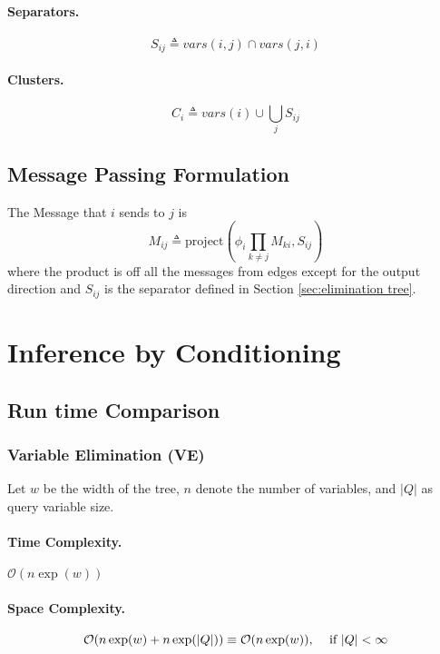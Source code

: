 \documentclass[11pt]{article}
\begin{document}
\paragraph{Separators.} 
\begin{equation}
	S_{ij} \triangleq vars(i, j) \cap vars(j, i)
\end{equation}

\paragraph{Clusters.} 
\begin{equation}
	C_i \triangleq vars(i) \cup \bigcup_j S_{ij}
\end{equation}

\subsection{Message Passing Formulation}
The Message that $i$ sends to $j$ is 
\begin{equation}
	M_{ij} \triangleq \mathrm{project} \left( \phi_i \prod_{k \neq j } M_{ki}, S_{ij} \right) 
\end{equation}
where the product is off all the messages from edges except for the output direction and $S_{ij}$ is the separator defined in Section \ref{sec:elimination tree}.


\section{Inference by Conditioning}
\subsection{Run time Comparison}
\subsubsection{Variable Elimination (VE)}
Let $w$ be the width of the tree, $n$ denote the number of variables, and $|Q|$ as query variable size.
\paragraph{Time Complexity.} $\mathcal O (n \exp (w))$

\paragraph{Space Complexity.} 
\begin{equation}
	\mathcal O (n \exp (w) + n \exp (|Q|)) \equiv \mathcal O (n \exp (w)) \text{, \quad if } |Q| < \infty
\end{equation}
\end{document}
